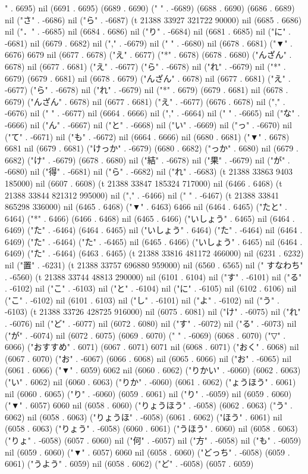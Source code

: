 " . 6695) nil (6691 . 6695) (6689 . 6690) (" " . -6689) (6688 . 6690) (6686 . 6689) nil ("さ" . -6686) nil ("ら" . -6687) (t 21388 33927 321722 90000) nil (6685 . 6686) nil ("．" . -6685) nil (6684 . 6686) nil ("り" . -6684) nil (6681 . 6685) nil ("に" . -6681) nil (6679 . 6682) nil ("," . -6679) nil (" " . -6680) nil (6678 . 6681) ("▼" . 6676) 6679 nil (6677 . 6678) ("え" . 6677) ("*" . 6678) (6678 . 6680) ("んざん" . 6678) nil (6677 . 6681) ("え" . -6677) ("ら" . -6678) nil ("れ" . -6679) nil ("*" . 6679) (6679 . 6681) nil (6678 . 6679) ("んざん" . 6678) nil (6677 . 6681) ("え" . -6677) ("ら" . -6678) nil ("れ" . -6679) nil ("*" . 6679) (6679 . 6681) nil (6678 . 6679) ("んざん" . 6678) nil (6677 . 6681) ("え" . -6677) (6676 . 6678) nil ("," . -6676) nil (" " . -6677) nil (6664 . 6666) nil ("," . -6664) nil (" " . -6665) nil ("な" . -6666) nil ("ん" . -6667) nil ("と" . -6668) nil ("い" . -6669) nil ("っ" . -6670) nil ("て" . -6671) nil ("も" . -6672) nil (6664 . 6666) nil (6680 . 6681) ("▼" . 6678) 6681 nil (6679 . 6681) ("けっか" . -6679) (6680 . 6682) ("っか" . 6680) nil (6679 . 6682) ("け" . -6679) (6678 . 6680) nil ("結" . -6678) nil ("果" . -6679) nil ("が" . -6680) nil ("得" . -6681) nil ("ら" . -6682) nil ("れ" . -6683) (t 21388 33863 9403 185000) nil (6607 . 6608) (t 21388 33847 185324 717000) nil (6466 . 6468) (t 21388 33844 821312 995000) nil ("," . -6466) nil (" " . -6467) (t 21388 33841 865298 336000) nil (6465 . 6468) ("▼" . 6463) 6466 nil (6464 . 6465) ("たと" . 6464) ("*" . 6466) (6466 . 6468) nil (6465 . 6466) ("いしょう" . 6465) nil (6464 . 6469) ("た" . -6464) (6464 . 6465) nil ("いしょう" . 6464) ("た" . -6464) nil (6464 . 6469) ("た" . -6464) ("た" . -6465) nil (6465 . 6466) ("いしょう" . 6465) nil (6464 . 6469) ("た" . -6464) (6463 . 6465) (t 21388 33816 481172 466000) nil (6231 . 6232) nil ("置" . -6231) (t 21388 33757 696880 959000) nil (6560 . 6565) nil (" すなわち" . -6560) (t 21388 33744 48813 290000) nil (6101 . 6104) nil ("す" . -6101) nil ("る" . -6102) nil ("こ" . -6103) nil ("と" . -6104) nil ("に" . -6105) nil (6102 . 6106) nil ("こ" . -6102) nil (6101 . 6103) nil ("し" . -6101) nil ("よ" . -6102) nil ("う" . -6103) (t 21388 33726 428725 916000) nil (6075 . 6081) nil ("け" . -6075) nil ("れ" . -6076) nil ("ど" . -6077) nil (6072 . 6080) nil ("す" . -6072) nil ("る" . -6073) nil ("が" . -6074) nil (6072 . 6075) (6069 . 6070) (" " . -6069) (6068 . 6070) ("▽" . 6066) ("おすすめ" . 6071) (6067 . 6071) 6071 nil (6068 . 6071) ("おく" . 6068) nil (6067 . 6070) ("お" . -6067) (6066 . 6068) nil (6065 . 6066) nil ("お" . -6065) nil (6061 . 6066) ("▼" . 6059) 6062 nil (6060 . 6062) ("りかい" . -6060) (6062 . 6063) ("い" . 6062) nil (6060 . 6063) ("りか" . -6060) (6061 . 6062) ("ょうほう" . 6061) nil (6060 . 6065) ("り" . -6060) (6059 . 6061) nil ("り" . -6059) nil (6059 . 6060) ("▼" . 6057) 6060 nil (6058 . 6060) ("りょうほう" . -6058) (6062 . 6063) ("う" . 6062) nil (6058 . 6063) ("りょうほ" . -6058) (6061 . 6062) ("ほう" . 6061) nil (6058 . 6063) ("りょう" . -6058) (6060 . 6061) ("うほう" . 6060) nil (6058 . 6063) ("りょ" . -6058) (6057 . 6060) nil ("何" . -6057) nil ("方" . -6058) nil ("も" . -6059) nil (6059 . 6060) ("▼" . 6057) 6060 nil (6058 . 6060) ("どっち" . -6058) (6059 . 6061) ("うよう" . 6059) nil (6058 . 6062) ("ど" . -6058) (6057 . 6059) 